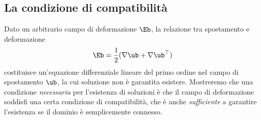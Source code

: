 \subsection{La condizione di compatibilità}
Dato un arbitrario campo di deformazione $\Eb$, la relazione tra spostamento e deformazione
\begin{equation}
	\Eb=\frac12(\nabla\ub +\nabla\ub^\top)
\end{equation}
costituisce un'equazione differenziale  lineare del primo ordine nel campo di spostamento $\ub$, la cui soluzione non è garantita esistere. Mostreremo che una condizione \textit{necessaria} per l'esistenza di soluzioni è che il campo di deformazione soddisfi una certa condizione di compatibilità, che è anche \textit{sufficiente} a garantire l'esistenza se il dominio è semplicemente connesso.

